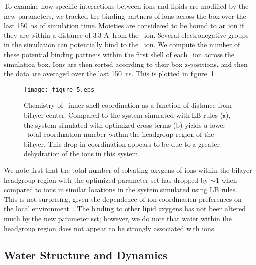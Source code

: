 To examine how specific interactions between ions and lipids are modified by the new parameters, 
we tracked the binding partners of ions across the box over the last 150~ns of simulation time. 
Moieties are considered to be bound to an ion if they are within a distance of 3.3 \AA~from the \na~ion. 
Several electronegative groups in the simulation can potentially bind to the \na~ion. 
We compute the number of these potential binding partners within the first shell of each \na~ion
across the simulation box. 
Ions are then sorted according to their box z-positions, and then the data are averaged over the last 150~ns. 
This is plotted in figure~\ref{figch2:cood}. 
\begin{figure}[h!tb]
    \caption[\na inner shell coordination partners]{Chemistry of \na~inner shell coordination as a function of distance from bilayer
center. Compared to the system simulated with LB rules (a), the system simulated with optimized cross terms (b)
        yields a lower \na~total coordination number within the headgroup region of the bilayer. 
        This drop in coordination appears to be due to a greater dehydration of the ions in this system.}
    \label{figch2:cood}
    \texttt{[image: figure\_5.eps]}
\end{figure}
We note first that the total number of solvating oxygens of ions within the bilayer headgroup
region with the optimized parameter set has dropped by $\sim 1$ when
compared to ions in similar locations in the system simulated using LB rules. 
This is not surprising, given the dependence of ion coordination
preferences on the local environment~\cite{varma:2008:JACS}. 
The binding to other lipid oxygens has not been altered much by the new parameter set; 
however, we do note that water within the headgroup region does not appear to be strongly associated with ions. 

\subsection{Water Structure and Dynamics}

